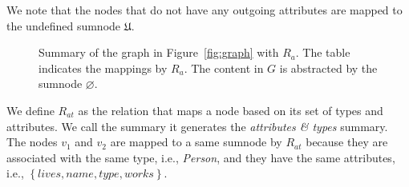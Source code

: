 \begin{remark}
We note that the nodes that do not have any outgoing attributes are mapped to the undefined sumnode $\mathfrak{U}$.
\end{remark}

\begin{figure}
	\centering
	\begin{minipage}{.75\textwidth}
		\resizebox{\textwidth}{!}{
			
		}
	\end{minipage}
	\quad
	\begin{minipage}[h]{.2\textwidth}
		\centering
		\caption*{$R_a\left(V, \mathcal{W}\right)$}
	\end{minipage}
	\caption{Summary of the graph in Figure~\ref{fig:graph} with $R_a$. The table indicates the mappings by $R_a$. The content in $G$ is abstracted by the sumnode $\varnothing$.}
	\label{fig:attributes-summary}
\end{figure}
\vspace{.5cm}


We define $R_{at}$ as the relation that maps a node based on its set of types and attributes. We call the summary it generates the \emph{attributes \& types} summary.
The nodes $v_1$ and $v_2$ are mapped to a same sumnode by $R_{at}$ because they are associated with the same type, i.e., \emph{Person}, and they have the same attributes, i.e., $\left\lbrace lives, name, type, works \right\rbrace$.

